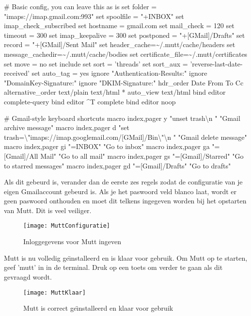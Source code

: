 \documentclass[12pt]{article}
\begin{document}
\# Basic config, you can leave this as is
set folder = "imaps://imap.gmail.com:993"
set spoolfile = "+INBOX"
set imap\_check\_subscribed
set hostname = gmail.com
set mail\_check = 120
set timeout = 300
set imap\_keepalive = 300
set postponed = "+[GMail]/Drafts"
set record = "+[GMail]/Sent Mail"
set header\_cache=\textasciitilde{}/.mutt/cache/headers
set message\_cachedir=\textasciitilde{}/.mutt/cache/bodies
set certificate\_file=\textasciitilde{}/.mutt/certificates
set move = no
set include
set sort = 'threads'
set sort\_aux = 'reverse-last-date-received'
set auto\_tag = yes
ignore "Authentication-Results:"
ignore "DomainKey-Signature:"
ignore "DKIM-Signature:"
hdr\_order Date From To Cc
alternative\_order text/plain text/html *
auto\_view text/html
bind editor  complete-query
bind editor \^{}T complete
bind editor  noop 


\# Gmail-style keyboard shortcuts
macro index,pager y "unset trash\textbackslash{}n " "Gmail archive message"
macro index,pager d "set trash=\textbackslash{}"imaps://imap.googlemail.com/[GMail]/Bin\textbackslash{}"\textbackslash{}n " "Gmail delete message"
macro index,pager gi "=INBOX" "Go to inbox"
macro index,pager ga "=[Gmail]/All Mail" "Go to all mail"
macro index,pager gs "=[Gmail]/Starred" "Go to starred messages"
macro index,pager gd "=[Gmail]/Drafts" "Go to drafts"

\vspace{10mm}

Als dit gebeurd is, verander dan de eerste zes regels zodat de configuratie van je eigen Gmailaccount gebeurd is. Als je het paswoord veld blanco laat, wordt er geen paswoord onthouden en moet dit telkens ingegeven worden bij het opstarten van Mutt. Dit is veel veiliger.

\begin{figure} [h]
\begin{center}
	\texttt{[image: MuttConfiguratie]}
\end{center}
	\caption{Inloggegevens voor Mutt ingeven}
\end{figure}

Mutt is nu volledig ge\"{\i}nstalleerd en is klaar voor gebruik. Om Mutt op te starten, geef 'mutt' in in de terminal. Druk op een toets om verder te gaan als dit gevraagd wordt.

\begin{figure} [!ht]
\begin{center}
	\texttt{[image: MuttKlaar]}
\end{center}
	\caption{Mutt is correct ge\"{\i}nstalleerd en klaar voor gebruik}
\end{figure}
\end{document}
